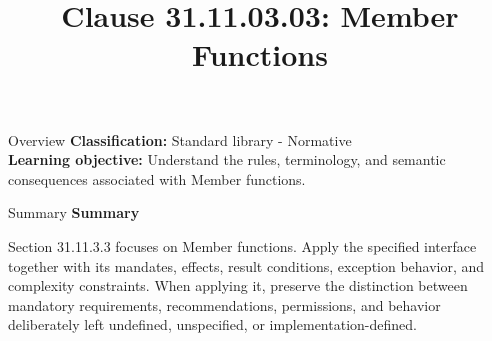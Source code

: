 \documentclass[10pt,letterpaper]{article}
\title{Clause 31.11.03.03: Member Functions}
\author{}
\date{}
\begin{document}
\maketitle
\begin{CornellOverviewBox}{Overview}
\textbf{Classification:} Standard library - Normative\\[2pt]
\textbf{Learning objective:} Understand the rules, terminology, and semantic consequences associated with Member functions.
\end{CornellOverviewBox}\begin{CornellSummaryBox}{Summary}
{\sffamily\bfseries\color{Accent} Summary}\par\vspace{3pt}Section 31.11.3.3 focuses on Member functions. Apply the specified interface together with its mandates, effects, result conditions, exception behavior, and complexity constraints. When applying it, preserve the distinction between mandatory requirements, recommendations, permissions, and behavior deliberately left undefined, unspecified, or implementation-defined.
\end{CornellSummaryBox}
\end{document}
